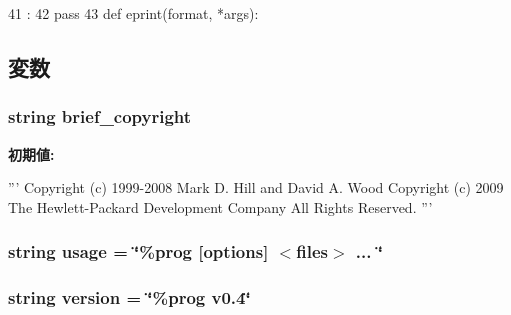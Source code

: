 \begin{DoxyCode}
41                          :
42     pass
43 
def eprint(format, *args):
\end{DoxyCode}


\subsection{変数}
\hypertarget{namespaceslicc_1_1main_a61508e4c829139942377f4782729bb82}{
\subsubsection[{brief\_\-copyright}]{\setlength{\rightskip}{0pt plus 5cm}string {\bf brief\_\-copyright}}}
\label{namespaceslicc_1_1main_a61508e4c829139942377f4782729bb82}
{\bfseries 初期値:}
\begin{DoxyCode}
'''
Copyright (c) 1999-2008 Mark D. Hill and David A. Wood
Copyright (c) 2009 The Hewlett-Packard Development Company
All Rights Reserved.
'''
\end{DoxyCode}
\hypertarget{namespaceslicc_1_1main_a61e5f066c879e5430d8f713c2c3a8b31}{
\subsubsection[{usage}]{\setlength{\rightskip}{0pt plus 5cm}string {\bf usage} = \char`\"{}\%prog \mbox{[}options\mbox{]} $<$files$>$ ... \char`\"{}}}
\label{namespaceslicc_1_1main_a61e5f066c879e5430d8f713c2c3a8b31}
\hypertarget{namespaceslicc_1_1main_af9c8593b58583463efe6932e24c9d6e6}{
\subsubsection[{version}]{\setlength{\rightskip}{0pt plus 5cm}string {\bf version} = \char`\"{}\%prog v0.4\char`\"{}}}
\label{namespaceslicc_1_1main_af9c8593b58583463efe6932e24c9d6e6}
